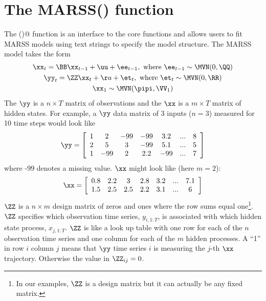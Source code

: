 \chapter{The MARSS() function}\label{chap:MARSS}

The \verb@MARSS()@ function is an interface to the core functions and allows users to fit MARSS models using text strings to specify the model structure.  The MARSS model takes the form
\begin{subequations}\label{eqn:mgompertz}
\begin{gather}
	\xx_t = \BB \xx_{t-1} + \uu + \ee_{t-1}, \text{ where } \ee_{t-1} \sim \MVN(0,\QQ)\label{eqn:mgompertzX}\\
	\yy_t = \ZZ \xx_t + \aa + \et_t, \text{ where } \et_t \sim \MVN(0,\RR)\label{eqn:mgompertzY}\\
	\xx_1 \sim \MVN(\pipi,\VV_1) \label{eqn:mgompertzX1}
\end{gather}
\end{subequations}
The $\yy$ is a $n \times T$ matrix of observations and the $\xx$ is a $m \times T$ matrix of hidden states.  For example, a $\yy$ data matrix of 3 inputs ($n=3$) measured for 10 time steps would look like
\begin{equation*}
\yy = \left[ \begin{array}{ccccccc}
    1 & 2 & -99 & -99 & 3.2 & ... &8\\
    2 & 5 &  3 & -99 & 5.1 & ... &5\\
    1 &-99 & 2 & 2.2 & -99 & ... &7\end{array} \right]
\end{equation*}
where -99 denotes a missing value.  $\xx$ might look like (here $m=2$):
\begin{equation*}
\xx = \left[ \begin{array}{ccccccc}
    0.8 & 2.2 & 3 & 2.8 & 3.2 & ... &7.1\\
    1.5 & 2.5 & 2.5 & 2.2 & 3.1 & ... &6\end{array} \right]
\end{equation*}
 $\ZZ$ is a $n \times m$ design matrix of zeros and ones where the row sums equal one\footnote{In our examples, $\ZZ$ is a design matrix but it can actually be any fixed matrix.}.  $\ZZ$ specifies which observation time series, $y_{i,1:T}$, is associated with which hidden state process, $x_{j,1:T}$.  $\ZZ$ is like a look up table with one row for each of the $n$ observation time series and one column for each of the $m$ hidden processes.  A ``1'' in row $i$ column $j$ means that $\yy$ time series $i$ is measuring the $j$-th $\xx$ trajectory.  Otherwise the value in $\ZZ_{ij}=0$.

